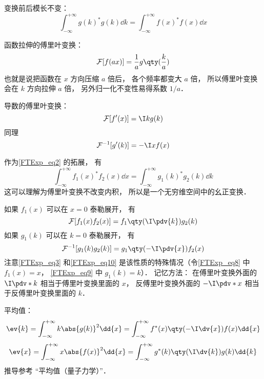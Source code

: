 变换前后模长不变：
\begin{equation}\label{FTExp_eq2}
\int_{-\infty}^{+\infty} g(k)^* g(k) \dd{k} = \int_{-\infty}^{+\infty} f(x)^* f(x) \dd{x}
\end{equation}

函数拉伸的傅里叶变换：
\begin{equation}
\mathcal F[f(ax)] = \frac{1}{a} g\qty(\frac{k}{a})
\end{equation}
也就是说把函数在 $x$ 方向压缩 $a$ 倍后， 各个频率都变大 $a$ 倍， 所以傅里叶变换会在 $k$ 方向拉伸 $a$ 倍， 另外归一化不变性易得系数 $1/a$．

导数的傅里叶变换：
\begin{equation}\label{FTExp_eq3}
\mathcal F [f'(x)] = \I k g(k)
\end{equation}
同理
\begin{equation}\label{FTExp_eq10}
\mathcal F^{-1} [g'(k)] = -\I x f(x)
\end{equation}

作为\autoref{FTExp_eq2} 的拓展， 有
\begin{equation}
\int_{-\infty}^{+\infty} f_1(x)^* f_2(x) \dd{x} = \int_{-\infty}^{+\infty} g_1(k)^* g_2(k) \dd{k}
\end{equation}
这可以理解为傅里叶变换不改变内积， 所以是一个无穷维空间中的幺正变换．

如果 $f_1(x)$ 可以在 $x = 0$ 泰勒展开， 有
\begin{equation}\label{FTExp_eq8}
\mathcal{F}[f_1(x) f_2(x)] = f_1\qty(\I \pdv{k}) g_2(k)
\end{equation}
如果 $g_1(k)$ 可以在 $k = 0$ 泰勒展开， 有
\begin{equation}\label{FTExp_eq9}
\mathcal{F}^{-1}[g_1(k) g_2(k)] = g_1\qty(-\I \pdv{x}) f_2(x)
\end{equation}
注意\autoref{FTExp_eq3} 和\autoref{FTExp_eq10} 是该性质的特殊情况（令\autoref{FTExp_eq8} 中 $f_1(x) = x$， \autoref{FTExp_eq9} 中 $g_1(k) = k$）． 记忆方法： 在傅里叶变换外面的 $\I\pdv*{k}$ 相当于傅里叶变换里面的 $x$， 反傅里叶变换外面的 $-\I\pdv*{x}$ 相当于反傅里叶变换里面的 $k$．

平均值：
\begin{equation}
\ev{k} = \int_{-\infty}^{+\infty} k\abs{g(k)}^2 \dd{x} = \int_{-\infty}^{+\infty} f^*(x)\qty(-\I \dv{x}) f(x) \dd{x}
\end{equation}
\begin{equation}
\ev{x} = \int_{-\infty}^{+\infty} x\abs{f(x)}^2 \dd{x} = \int_{-\infty}^{+\infty} g^*(k)\qty(\I \dv{k}) g(k) \dd{k}
\end{equation}
推导参考 “平均值（量子力学）”．

